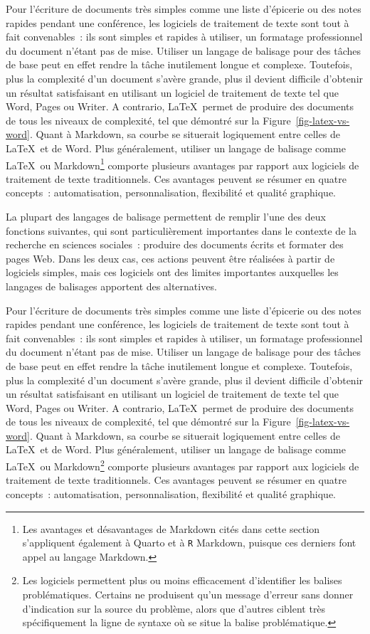 \documentclass[
  letterpaper,
]{scrbook}
\begin{document}
Pour l'écriture de documents très simples comme une liste d'épicerie ou
des notes rapides pendant une conférence, les logiciels de traitement de
texte sont tout à fait convenables~: ils sont simples et rapides à
utiliser, un formatage professionnel du document n'étant pas de mise.
Utiliser un langage de balisage pour des tâches de base peut en effet
rendre la tâche inutilement longue et complexe. Toutefois, plus la
complexité d'un document s'avère grande, plus il devient difficile
d'obtenir un résultat satisfaisant en utilisant un logiciel de
traitement de texte tel que Word, Pages ou Writer. A contrario,
\LaTeX~permet de produire des documents de tous les niveaux de
complexité, tel que démontré sur la Figure~\ref{fig-latex-vs-word}.
Quant à Markdown, sa courbe se situerait logiquement entre celles de
\LaTeX~et de Word. Plus généralement, utiliser un langage de balisage
comme \LaTeX~ou Markdown\footnote{Les avantages et désavantages de
  Markdown cités dans cette section s'appliquent également à Quarto et à
  \texttt{R} Markdown, puisque ces derniers font appel au langage
  Markdown.} comporte plusieurs avantages par rapport aux logiciels de
traitement de texte traditionnels. Ces avantages peuvent se résumer en
quatre concepts~: automatisation, personnalisation, flexibilité et
qualité graphique.

La plupart des langages de balisage permettent de remplir l'une des deux
fonctions suivantes, qui sont particulièrement importantes dans le
contexte de la recherche en sciences sociales~: produire des documents
écrits et formater des pages Web. Dans les deux cas, ces actions peuvent
être réalisées à partir de logiciels simples, mais ces logiciels ont des
limites importantes auxquelles les langages de balisages apportent des
alternatives.

Pour l'écriture de documents très simples comme une liste d'épicerie ou
des notes rapides pendant une conférence, les logiciels de traitement de
texte sont tout à fait convenables~: ils sont simples et rapides à
utiliser, un formatage professionnel du document n'étant pas de mise.
Utiliser un langage de balisage pour des tâches de base peut en effet
rendre la tâche inutilement longue et complexe. Toutefois, plus la
complexité d'un document s'avère grande, plus il devient difficile
d'obtenir un résultat satisfaisant en utilisant un logiciel de
traitement de texte tel que Word, Pages ou Writer. A contrario,
\LaTeX~permet de produire des documents de tous les niveaux de
complexité, tel que démontré sur la Figure~\ref{fig-latex-vs-word}.
Quant à Markdown, sa courbe se situerait logiquement entre celles de
\LaTeX~et de Word. Plus généralement, utiliser un langage de balisage
comme \LaTeX~ou Markdown\footnote{Les logiciels permettent plus ou moins
  efficacement d'identifier les balises problématiques. Certains ne
  produisent qu'un message d'erreur sans donner d'indication sur la
  source du problème, alors que d'autres ciblent très spécifiquement la
  ligne de syntaxe où se situe la balise problématique.} comporte
plusieurs avantages par rapport aux logiciels de traitement de texte
traditionnels. Ces avantages peuvent se résumer en quatre concepts~:
automatisation, personnalisation, flexibilité et qualité graphique.
\end{document}

